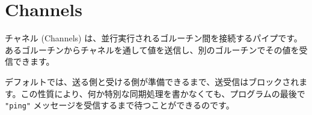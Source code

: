 \section{Channels}

チャネル (Channels) は、並行実行されるゴルーチン間を接続するパイプです。あるゴルーチンからチャネルを通して値を送信し、別のゴルーチンでその値を受信できます。




デフォルトでは、送る側と受ける側が準備できるまで、送受信はブロックされます。この性質により、何か特別な同期処理を書かなくても、プログラムの最後で \texttt{"ping"} メッセージを受信するまで待つことができるのです。